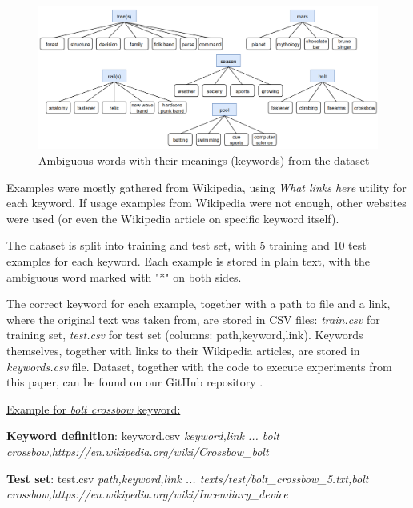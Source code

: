 \documentclass{llncs}
\begin{document}
\begin{figure}
    \label{fig:keywords}
    \caption{Ambiguous words with their meanings (keywords) from the dataset}
    \includegraphics[scale=0.35]{res/keywords.png}
\end{figure}

Examples were mostly gathered from Wikipedia, using \textit{What links here} utility for each keyword.
If usage examples from Wikipedia were not enough, other websites were used (or even the Wikipedia article on specific keyword itself).

The dataset is split into training and test set, with 5 training and 10 test examples for each keyword.
Each example is stored in plain text, with the ambiguous word marked with "*" on both sides.

The correct keyword for each example, together with a path to file and a link, where the original text was taken from, are stored in CSV files: \textit{train.csv} for training set, \textit{test.csv} for test set (columns: path,keyword,link).
Keywords themselves, together with links to their Wikipedia articles, are stored in \textit{keywords.csv} file.
Dataset, together with the code to execute experiments from this paper, can be found on our GitHub repository \cite{repository}.

\bigskip
\underline{Example for \textit{bolt crossbow} keyword:}

\smallskip
\textbf{Keyword definition}: keyword.csv\newline
\textit{
keyword,link\newline
...\newline
bolt crossbow,https://en.wikipedia.org/wiki/Crossbow\_bolt}

\smallskip
\textbf{Test set}: test.csv\newline
\textit{
path,keyword,link\newline
...\newline
texts/test/bolt\_crossbow\_5.txt,bolt crossbow,https://en.wikipedia.org/wiki/Incendiary\_device
}
\end{document}
